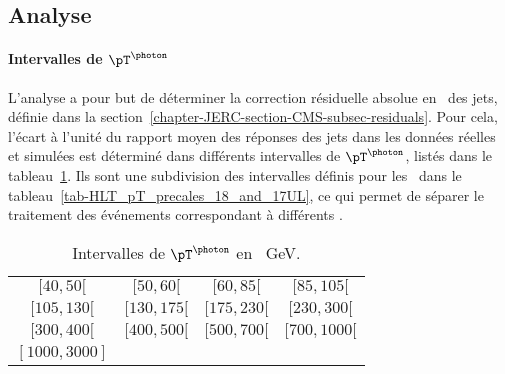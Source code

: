 \subsection{Analyse}\label{chapter-JERC-section-JES-subsec-analyse}
\paragraph{Intervalles de $\pT^{\photon}$}
L'analyse a pour but de déterminer la correction résiduelle absolue en \pT\ des jets, définie dans la section~\ref{chapter-JERC-section-CMS-subsec-residuals}.
Pour cela, l'écart à l'unité du rapport moyen des réponses des jets dans les données réelles et simulées est déterminé dans différents intervalles de $\pT^{\photon}$, listés dans le tableau~\ref{tab-pT_photon_intervalles}.
Ils sont une subdivision des intervalles définis pour les \HLTpaths\ dans le tableau~\ref{tab-HLT_pT_precales_18_and_17UL}, ce qui permet de séparer le traitement des événements correspondant à différents \HLTpaths.
\begin{table}[h]
\centering
\begin{tabular}{cccc}
\toprule
$[\num{40}, \num{50}[$ & $[\num{50}, \num{60}[$ & $[\num{60}, \num{85}[$ & $[\num{85}, \num{105}[$ \\
$[\num{105}, \num{130}[$ & $[\num{130}, \num{175}[$ & $[\num{175}, \num{230}[$ & $[\num{230}, \num{300}[$ \\
$[\num{300}, \num{400}[$ & $[\num{400}, \num{500}[$ & $[\num{500}, \num{700}[$ & $[\num{700}, \num{1000}[$ \\
$[\num{1000}, \num{3000}]$ \\
\bottomrule
\end{tabular}
\caption[Intervalles de $\pT^{\photon}$.]{Intervalles de $\pT^{\photon}$ en \SI{}{\GeV}.}
\label{tab-pT_photon_intervalles}
\end{table}
